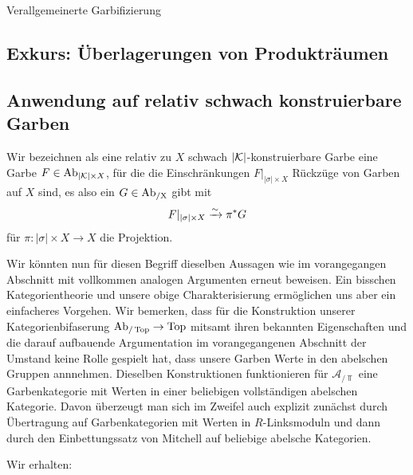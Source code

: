 Verallgemeinerte Garbifizierung

\subsection{Exkurs: Überlagerungen von Produkträumen}


\subsection{Anwendung auf relativ schwach konstruierbare Garben} 

Wir bezeichnen als eine relativ zu $X$ schwach $|\mathcal{K}|$-konstruierbare
Garbe eine Garbe $F \in \operatorname{Ab}_{|\mathcal{K}| \times X}$, für die die
Einschränkungen $F|_{|\sigma| \times X}$ Rückzüge von Garben auf $X$
sind, es also ein $G \in \operatorname{Ab_{/X}}$ gibt mit
\[ F|_{|\sigma| \times X} \xrightarrow{\sim} \pi^* G \]
für $\pi: |\sigma| \times X \to X$ die Projektion.

Wir könnten nun für diesen Begriff dieselben Aussagen wie im
vorangegangen Abschnitt mit vollkommen analogen Argumenten erneut
beweisen. Ein bisschen Kategorientheorie und unsere obige
Charakterisierung ermöglichen uns aber ein einfacheres Vorgehen. Wir
bemerken, dass für die Konstruktion unserer Kategorienbifaserung
$\operatorname{Ab}_{/\operatorname{Top}} \to \operatorname{Top}$ mitsamt ihren bekannten Eigenschaften und die
darauf aufbauende Argumentation im vorangegangenen Abschnitt der
Umstand keine Rolle gespielt hat, dass unsere Garben Werte in den
abelschen Gruppen annnehmen. Dieselben Konstruktionen funktionieren
für $\mathcal{A}_{/\Top}$ eine Garbenkategorie mit Werten in einer
beliebigen vollständigen abelschen Kategorie. Davon überzeugt man sich
im Zweifel auch explizit zunächst durch Übertragung auf
Garbenkategorien mit Werten in $R$-Linksmoduln und dann durch den
Einbettungssatz von Mitchell auf beliebige abelsche Kategorien.

Wir erhalten:
\begin{theorem}
\end{theorem}


